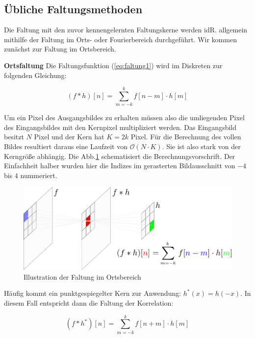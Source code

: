 \documentclass[a4paper,12pt]{article}
\begin{document}
\subsection{Übliche Faltungsmethoden}\label{chp:faltungen}
Die Faltung mit den zuvor kennengelernten Faltungskerne werden idR. allgemein
mithilfe der Faltung im Orts- oder Fourierbereich durchgeführt. Wir kommen
zunächst zur Faltung im Ortsbereich.

\textbf{Ortsfaltung} Die Faltungsfunktion
(\ref{eq:faltung1}) wird im Diskreten zur folgenden Gleichung:

\begin{equation} \label{eq:faltungssumme}
(f*h)[n] = \sum_{m=-k}^{k} {f[n-m] \cdot h[m]}
\end{equation}

Um ein Pixel des Ausgangsbildes zu erhalten müssen also die umliegenden Pixel des Eingangsbildes mit den Kernpixel
multipliziert werden. Das Eingangsbild besitzt $N$ Pixel und der Kern hat $K=2k$
Pixel. Für die Berechnung des vollen Bildes resultiert daraus
eine Laufzeit von $\mathcal O(N\cdot K)$. Sie ist also stark von der Kerngröße
abhängig. Die Abb.\ref{figure_IlluFaltung} schematisiert die
Berechnungsvorschrift. Der Einfachheit halber wurden hier die Indizes im
gerasterten Bildausschnitt von $-4$ bis $4$ nummeriert. 
 
\begin{figure}[htbp]
\centering
\includegraphics[scale=1.0]{faltung_illustration.png}
\caption{Illustration der Faltung im Ortsbereich}%
\label{figure_IlluFaltung}
\end{figure}

Häufig kommt ein
punktgespiegelter Kern zur Anwendung: $h^{*}(x) = h(-x)$. In diesem Fall
entspricht dann die Faltung der Korrelation: 

\begin{equation} \label{eq:korrelation}
(f*h^*)[n] = \sum_{m=-k}^{k} {f[n+m] \cdot h[m]}
\end{equation}
 
\end{document}
